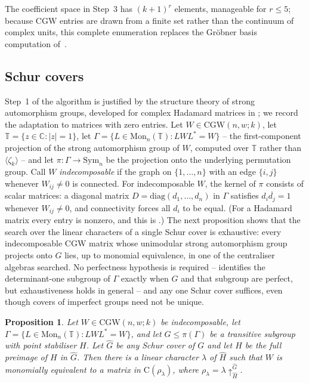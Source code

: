 \documentclass{article}
\newtheorem{proposition}[theorem]{Proposition}
\theoremstyle{definition}
\theoremstyle{remark}
\newcommand{\Cr}{\mathrm{C}}
\newcommand{\CGW}{\mathrm{CGW}}
\newcommand{\Mon}{\mathrm{Mon}}
\newcommand{\diag}{\mathrm{diag}}
\newcommand{\myuparrow}{\!\uparrow}
\begin{document}
The coefficient space in Step~3 has $(k+1)^r$ elements, manageable for $r \leq 5$; because $\CGW$ entries are drawn from a finite set rather than the continuum of complex units, this complete enumeration replaces the Gr\"{o}bner basis computation of~\cite{Monrep}.

\subsection{Schur covers}\label{sec:schur}

Step~1 of the algorithm is justified by the structure theory of strong
automorphism groups, developed for complex Hadamard matrices in
\cite[Section~6]{Monrep}; we record the adaptation to matrices with zero
entries.  Let $W \in \CGW(n,w;k)$, let
$\mathbb{T} = \{z \in \mathbb{C} : |z| = 1\}$, let
$\Gamma = \{L \in \Mon_n(\mathbb{T}) : LWL^{\ast} = W\}$ -- the
first-component projection of the strong automorphism group of $W$,
computed over $\mathbb{T}$ rather than $\langle \zeta_k \rangle$ -- and
let $\pi \colon \Gamma \rightarrow \mathrm{Sym}_n$ be the projection onto
the underlying permutation group.  Call $W$ \emph{indecomposable} if the
graph on $\{1, \ldots, n\}$ with an edge $\{i,j\}$ whenever
$W_{ij} \neq 0$ is connected.  For indecomposable $W$, the kernel of
$\pi$ consists of scalar matrices: a diagonal matrix
$D = \diag(d_1, \ldots, d_n)$ in $\Gamma$ satisfies
$d_i \overline{d_j} = 1$ whenever $W_{ij} \neq 0$, and connectivity
forces all $d_i$ to be equal.  (For a Hadamard matrix every entry is
nonzero, and this is \cite[Prop.~6.1]{Monrep}.)  The next proposition
shows that the search over the linear characters of a single Schur cover
is exhaustive: every indecomposable $\CGW$ matrix whose unimodular strong
automorphism group projects onto $G$ lies, up to monomial equivalence, in
one of the centraliser algebras searched.  No perfectness hypothesis is
required -- \cite[Prop.~6.2]{Monrep} identifies the determinant-one
subgroup of $\Gamma$ exactly when $G$ and that subgroup are perfect, but
exhaustiveness holds in general -- and any one Schur cover suffices, even
though covers of imperfect groups need not be unique.


\begin{proposition}\label{prop:lifting}
Let $W \in \CGW(n,w;k)$ be indecomposable, let
$\Gamma = \{L \in \Mon_n(\mathbb{T}) : LWL^{\ast} = W\}$, and let
$G \leq \pi(\Gamma)$ be a transitive subgroup with point stabiliser $H$.
Let $\widehat{G}$ be any Schur cover of $G$ and let $\widehat{H}$ be the
full preimage of $H$ in $\widehat{G}$.  Then there is a linear character
$\lambda$ of $\widehat{H}$ such that $W$ is monomially equivalent to a
matrix in $\Cr(\rho_\lambda)$, where
$\rho_\lambda = \lambda \myuparrow_{\widehat{H}}^{\widehat{G}}$.
\end{proposition}
\end{document}
